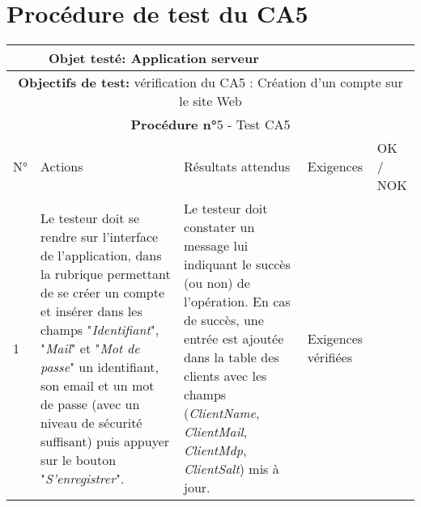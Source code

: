 \section{Procédure de test du CA5}
\begin{table}[!h]
        \centering
        \begin{tabular}{|m{0.6cm}|
                         >{\raggedright\arraybackslash}m{4cm}|
                         >{\raggedright\arraybackslash}m{6.4cm}|
                         >{\raggedright\arraybackslash}m{2cm}|
                         m{1cm}|}
            \hline
            \multicolumn{3}{|c|}{
                \textbf{Objet testé: } Application serveur
            } & \multicolumn{2}{|c|}{
                \textbf{Version: } version    
            } \\
            \hline
            \multicolumn{5}{|c|}{\textbf{Objectifs de test:}
                vérification du CA5 : Création d'un compte sur le site Web} \\
            \hline
            \multicolumn{5}{|c|}{
                \textbf{Procédure n°}5 - Test CA5
            } \\
            \hline
            N° & Actions & Résultats attendus & Exigences & OK / NOK \\
            \hline      %
            1 & Le testeur doit se rendre sur l'interface de l'application,
                dans la rubrique permettant de se créer un compte et insérer
                dans les champs "\emph{Identifiant}", "\emph{Mail}" et 
                "\emph{Mot de passe}" un identifiant, son email et un mot de 
                passe (avec un niveau de sécurité suffisant) puis appuyer sur
                le bouton "\emph{S'enregistrer}".
              & Le testeur doit constater un message lui indiquant le succès (ou non)
                de l'opération. En cas de succès, une entrée est ajoutée dans la table 
                des clients avec les champs (\emph{ClientName}, \emph{ClientMail}, 
                \emph{ClientMdp}, \emph{ClientSalt}) mis à jour. 
              & Exigences vérifiées & \\
            \hline
        \end{tabular} 
        \label{tab:tab5}
\end{table}
\newpage

